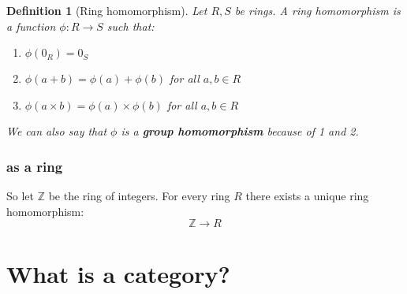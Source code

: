 \documentclass{article}
\newtheorem{definition}{Definition}
\begin{document}
    \begin{definition}[Ring homomorphism]
        Let $R, S$ be rings.
        A ring homomorphism is a function $\phi: R \to S$ such that:
        \begin{enumerate}
            \item $\phi(0_R) = 0_S$
            \item $\phi(a + b) = \phi(a) + \phi(b)$ for all $a, b \in R$
            \item $\phi(a \times b) = \phi(a) \times \phi(b)$ for all $a, b \in R$
        \end{enumerate}
        We can also say that $\phi$ is a \textbf{group homomorphism} because of 1 and 2.
    \end{definition}

    \subsubsection{ as a ring}

    So let $\mathbb{Z}$ be the ring of integers. For every ring $R$ there exists a unique ring homomorphism:
    \[
        \mathbb{Z} \to R
    \]


    \section{What is a category?}
\end{document}
